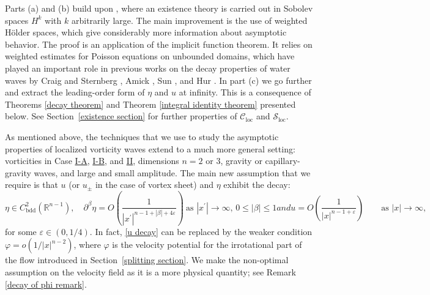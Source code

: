 \documentclass[11pt,reqno]{amsart}
\newcommand{\NS}{\texorpdfstring{\hyperref[sec non-singular]{I-A}}{I-A}}
\newcommand{\PV}{\texorpdfstring{\hyperref[sec point]{I-B}}{I-B}}
\newcommand{\VS}{\texorpdfstring{\hyperref[sec sheets]{II}}{II}}
\newcommand\bdd{{\mathrm{bdd}}}
\newcommand{\R}{\mathbb{R}}
\theoremstyle{plain}
\theoremstyle{remark}
\numberwithin{equation}{section}
\begin{document}
Parts (a) and (b) build upon \cite[Theorem 2.1, Theorem 2.3]{shatah2013travelling}, where an existence theory is carried out in Sobolev spaces $H^k$ with $k$ arbitrarily large.  The main improvement is the use of weighted H\"older spaces, which give considerably more information about asymptotic behavior.  The proof is an application of the implicit function theorem. It relies on weighted estimates 
for Poisson equations on unbounded domains,  which have played an important role in previous works on the decay properties of water waves by Craig and Sternberg \cite{craig1988symmetry}, Amick \cite{amick1994internal}, Sun \cite{sun1996asymptotic,sun1997analytical}, and Hur \cite{hur2008symmetry}.  In part (c) we go further and extract the leading-order form of $\eta$ and $u$ at infinity.  This is a consequence of Theorems \ref{decay theorem} and Theorem \ref{integral identity theorem} presented below.  See Section~\ref{existence section} for further properties of $\mathscr{C}_{\mathrm{loc}}$ and $\mathscr{S}_{\mathrm{loc}}$.


As mentioned above, the techniques that we use to study the asymptotic properties of localized vorticity waves extend to a much more general setting: vorticities in Case \NS, \PV, and \VS, dimensions $n=2$ or $3$, gravity or capillary-gravity waves, and large and small amplitude. The main new assumption that we require is that $u$ (or $u_\pm$ in the case of vortex sheet) and $\eta$ exhibit the  decay:
\begin{subequations} \label{decay assumptions}
\begin{equation}
  \eta \in C^2_\bdd(\R^{n-1}),
  \quad 
  \partial^\beta \eta = O\left(\frac{1}{|x^\prime|^{ n-1+|\beta|+4\varepsilon}}\right) 
  \ 
  \textrm{as $|x^\prime| \to \infty$, $0 \leq |\beta| \leq 1$}  \label{eta decay} 
\end{equation}
and
\begin{equation}
  u = O\left( \frac{1}{|x|^{n-1+\varepsilon}}\right) \qquad \textrm{as } |x| \to \infty, \label{u decay} 
\end{equation}
\end{subequations}
for some $\varepsilon \in (0,1/4)$.  In fact, \eqref{u decay} can be replaced by the weaker condition $\varphi = o(1/|x|^{n-2})$, where $\varphi$ is the velocity potential for the irrotational part of the flow introduced in Section~\ref{splitting section}. We make the non-optimal assumption on the velocity field as it is a more physical quantity;  see Remark \ref{decay of phi remark}.
 
\end{document}
